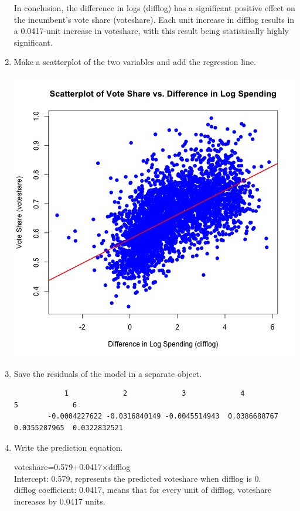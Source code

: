 \documentclass[12pt,letterpaper]{article}
\begin{document}
\begin{enumerate}
		In conclusion, the difference in logs (difflog) has a significant positive effect on the incumbent's vote share (voteshare). Each unit increase in difflog results in a 0.0417-unit increase in voteshare, with this result being statistically highly significant.\\
		
			\vspace{1cm}
		
		\item Make a scatterplot of the two variables and add the regression line. 
			  
				\includegraphics[width=.85\textwidth]{scatterplot_voteshare_difflog.jpg}
			\vspace{7cm}
			
		\item Save the residuals of the model in a separate object.	
			  
		\begin{verbatim}
		    1             2             3             4             5             6 
		-0.0004227622 -0.0316840149 -0.0045514943  0.0386688767  0.0355287965  0.0322832521 
		\end{verbatim}  

				
		\item Write the prediction equation.
		
		voteshare=0.579+0.0417×difflog\\
		
		Intercept: 0.579, represents the predicted voteshare when difflog is 0.\\
		difflog coefficient: 0.0417, means that for every unit of difflog, voteshare increases by 0.0417 units.\\

	\end{enumerate}
	
\end{document}

